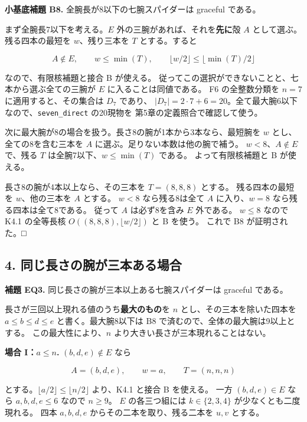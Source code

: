 \documentclass[
  10pt,
  a4paper,
]{article}
\begin{document}
\textbf{小基底補題 B8.} 全腕長が8以下の七腕スパイダーは graceful
である。

まず全腕長7以下を考える。\(E\) 外の三腕があれば、それを\textbf{先に}殻
\(A\) として選ぶ。 残る四本の最短を \(w\)、残り三本を \(T\)
とする。すると

\[
A\notin E,\qquad w\le\min(T),\qquad
\lfloor w/2\rfloor\le\lfloor\min(T)/2\rfloor
\]

なので、有限核補題と接合 B が使える。
従ってこの選択ができないことと、七本から選ぶ全ての三腕が \(E\)
に入ることは同値である。 F6 の全整数分類を \(n=7\)
に適用すると、その集合は \(D_7\) であり、
\(|D_7|=2\cdot7+6=20\)。全て最大腕6以下なので、\texttt{seven\_direct}
の20現物を 第5章の定義照合で確認して使う。

次に最大腕が8の場合を扱う。長さ8の腕が1本から3本なら、最短腕を \(w\)
とし、 全ての8を含む三本を \(A\) に選ぶ。足りない本数は他の腕で補う。
\(w<8\)、\(A\notin E\) で、残る \(T\) は全腕7以下、\(w\le\min(T)\)
である。 よって有限核補題と B が使える。

長さ8の腕が4本以上なら、その三本を \(T=(8,8,8)\) とする。
残る四本の最短を \(w\)、他の三本を \(A\) とする。 \(w<8\)
なら残る8は全て \(A\) に入り、\(w=8\) なら残る四本は全て8である。 従って
\(A\) は必ず8を含み \(E\) 外である。 \(w\le8\) なので K4.1 の全等長核
\(O((8,8,8),\lfloor w/2\rfloor)\) と B を使う。 これで B8
が証明された。□

\subsection{4.
同じ長さの腕が三本ある場合}\label{ux540cux3058ux9577ux3055ux306eux8155ux304cux4e09ux672cux3042ux308bux5834ux5408}

\textbf{補題 EQ3.} 同じ長さの腕が三本以上ある七腕スパイダーは graceful
である。

長さが三回以上現れる値のうち\textbf{最大のもの}を \(n\)
とし、その三本を除いた四本を \(a\le b\le d\le e\) と書く。最大腕8以下は
B8 で済むので、全体の最大腕は9以上とする。 この最大性により、\(n\)
より大きい長さが三本現れることはない。

\textbf{場合 I：\(a\le n\).} \((b,d,e)\notin E\) なら

\[
A=(b,d,e),\qquad w=a,\qquad T=(n,n,n)
\]

とする。\(\lfloor a/2\rfloor\le\lfloor n/2\rfloor\) より、K4.1 と接合 B
を使える。 一方 \((b,d,e)\in E\) なら \(a,b,d,e\le6\) なので \(n\ge9\)。
\(E\) の各三つ組には \(k\in\{2,3,4\}\) が少なくとも二度現れる。 四本
\(a,b,d,e\) からその二本を取り、残る二本を \(u,v\) とする。
\end{document}
